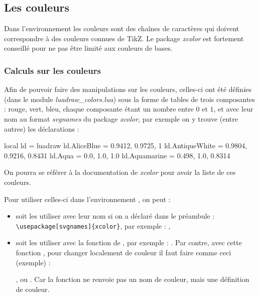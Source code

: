 \subsection{Les couleurs}

Dans l'environnement \luadrawenv les couleurs sont des chaînes de caractères qui doivent correspondre à des couleurs connues de TikZ. Le package \emph{xcolor} est fortement conseillé pour ne pas être limité aux couleurs de bases.

\subsubsection{Calculs sur les couleurs}

Afin de pouvoir faire des manipulations sur les couleurs, celles-ci ont été définies (dans le module \emph{luadraw\_colors.lua}) sous la forme de tables de trois composantes : rouge, vert, bleu, chaque composante étant un nombre entre $0$ et $1$, et avec leur nom au format \emph{svgnames} du package \emph{xcolor}, par exemple on y trouve (entre autres) les déclarations :
\begin{Luacode}
local ld = luadraw
ld.AliceBlue = {0.9412, 0.9725, 1}
ld.AntiqueWhite = {0.9804, 0.9216, 0.8431}
ld.Aqua = {0.0, 1.0, 1.0}
ld.Aquamarine = {0.498, 1.0, 0.8314}
\end{Luacode}
On pourra se référer à la documentation de \emph{xcolor} pour avoir la liste de ces couleurs.

Pour utiliser celles-ci dans l'environnement \luadrawenv, on peut :
\begin{itemize}
    \item soit les utiliser avec leur nom si on a déclaré dans le préambule : \verb|\usepackage[svgnames]{xcolor}|, par exemple : ,
    
    \item soit les utiliser avec la fonction  de \luadrawenv, par exemple : . Par contre, avec cette fonction , pour changer localement de couleur il faut faire comme ceci (exemple) : \par
    , ou . Car la fonction  ne renvoie pas un nom de couleur, mais une définition de couleur.
\end{itemize}

